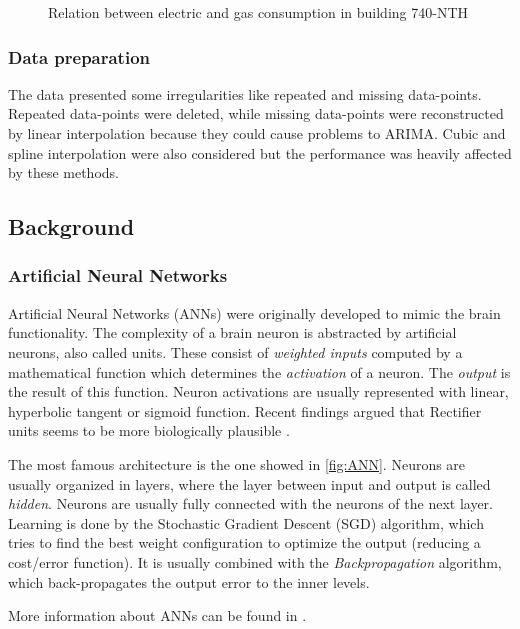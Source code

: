 \documentclass{sig-alternate-sigmod07}
\begin{document}
\begin{figure}[h!]
\centering
{}
\caption{Relation between electric and gas consumption in building 740-NTH}
\label{fig:monthlyGasElectr}
\end{figure}



\subsubsection{Data preparation}
\label{sec:cleaning}
The data presented some irregularities like repeated and missing data-points. Repeated data-points were deleted, while missing data-points were reconstructed by linear interpolation because they could cause problems to ARIMA. Cubic and spline interpolation were also considered but the performance was heavily affected by these methods.


\subsection{Background}


\subsubsection{Artificial Neural Networks}
Artificial Neural Networks (ANNs) were originally developed to mimic the brain functionality. The complexity of a brain neuron is abstracted by artificial neurons, also called units. These consist of \emph{weighted inputs} computed by a mathematical function which determines the \emph{activation} of a neuron. The \emph{output} is the result of this function. Neuron activations are usually represented with linear, hyperbolic tangent or sigmoid function. Recent findings argued that Rectifier units seems to be more biologically plausible \cite{glorot2011deep}.

The most famous architecture is the one showed in \cref{fig:ANN}. Neurons are usually organized in layers, where the layer between input and output is called \emph{hidden}. Neurons are usually fully connected with the neurons of the next layer. Learning is done by the Stochastic Gradient Descent (SGD) algorithm, which tries to find the best weight configuration to optimize the output (reducing a cost/error function). It is usually combined with the \emph{Backpropagation} algorithm, which back-propagates the output error to the inner levels.

More information about ANNs can be found in \cite{bishop2006pattern}.
\end{document}
